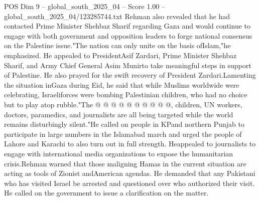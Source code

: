 \begin{textsample}{POS Dim 9 – global\_south\_2025\_04 – Score 1.00 – global\_south\_2025\_04/123285744.txt}
Rehman also revealed that he had contacted Prime Minister Shehbaz Sharif regarding Gaza and would continue to engage with both government and opposition leaders to forge national consensus on the Palestine issue."The nation can only unite on the basis ofIslam,"he emphasized.
He appealed to PresidentAsif Zardari, Prime Minister Shehbaz Sharif, and Army Chief General Asim Munirto take meaningful steps in support of Palestine.
He also prayed for the swift recovery of President Zardari.Lamenting the situation inGaza during Eid, he said that while Muslims worldwide were celebrating, Israeliforces were bombing Palestinian children, who had no choice but to play atop rubble."The @ @ @ @ @ @ @ @ @ @, children, UN workers, doctors, paramedics, and journalists are all being targeted while the world remains disturbingly silent."He called on people in KPand northern Punjab to participate in large numbers in the Islamabad march and urged the people of Lahore and Karachi to also turn out in full strength.
Heappealed to journalists to engage with international media organizations to expose the humanitarian crisis.Rehman warned that those maligning Hamas in the current situation are acting as tools of Zionist andAmerican agendas.
He demanded that any Pakistani who has visited Israel be arrested and questioned over who authorized their visit.
He called on the government to issue a clarification on the matter.

\end{textsample}
